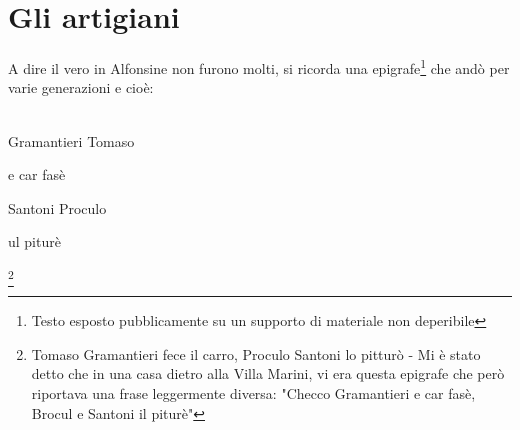 
\chapter{Gli artigiani}

A dire il vero in Alfonsine non furono molti, si ricorda una epigrafe\footnote{Testo esposto pubblicamente su un supporto di materiale non deperibile} che andò per varie generazioni e cioè:
\\\\
\textcal \Huge
	\centerline{Gramantieri Tomaso}
	\centerline{e car fasè}
	\centerline{Santoni Proculo}
	\centerline{ul piturè}\normalfont \normalsize \footnote{Tomaso Gramantieri fece il carro, Proculo Santoni lo pitturò - Mi è stato detto che in una casa dietro alla Villa Marini, vi era questa epigrafe che però riportava una frase leggermente diversa: "Checco Gramantieri e car fasè, Brocul e Santoni il piturè"}


